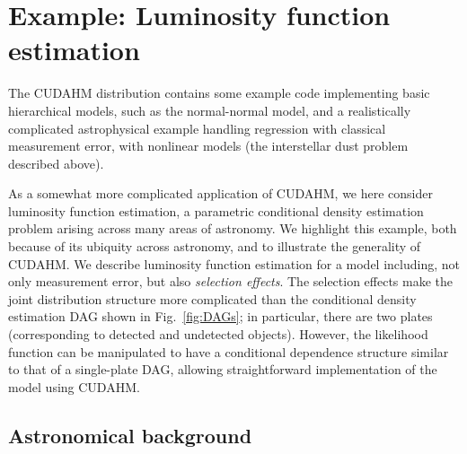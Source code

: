 \section{Example: Luminosity function estimation}
\label{sec:lum_func}

The CUDAHM distribution contains some example code implementing basic hierarchical models, such as the normal-normal model, and a realistically complicated astrophysical example handling regression with classical measurement error, with nonlinear models (the interstellar dust problem described above).

As a somewhat more complicated application of CUDAHM, we here consider luminosity function estimation, a parametric conditional density estimation problem arising across many areas of astronomy.
We highlight this example, both because of its ubiquity across astronomy, and to illustrate the generality of CUDAHM.
We describe luminosity function estimation for a model including, not only measurement error, but also \emph{selection effects}.
The selection effects make the joint distribution structure more complicated than the conditional density estimation DAG shown in Fig.~\ref{fig:DAGs}; in particular, there are two plates (corresponding to detected and undetected objects).
However, the likelihood function can be manipulated to have a conditional dependence structure similar to that of a single-plate DAG, allowing straightforward implementation of the model using CUDAHM.

\subsection{Astronomical background}
\label{sec:LF-astro}


